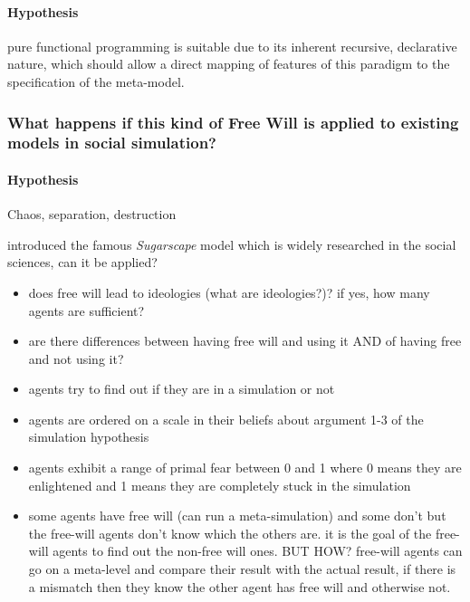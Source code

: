 \documentclass{article}
\begin{document}
\paragraph{Hypothesis} pure functional programming is suitable due to its inherent recursive, declarative nature, which should allow a direct mapping of features of this paradigm to the specification of the meta-model.

\subsubsection{What happens if this kind of Free Will is applied to existing models in social simulation?}
\paragraph{Hypothesis} Chaos, separation, destruction

\cite{epstein_growing_1996} introduced the famous \textit{Sugarscape} model which is widely researched in the social sciences, can it be applied?

\begin{itemize}
	\item does free will lead to ideologies (what are ideologies?)? if yes, how many agents are sufficient?
	\item are there differences between having free will and using it AND of having free and not using it?
	\item agents try to find out if they are in a simulation or not
	\item agents are ordered on a scale in their beliefs about argument 1-3 of the simulation hypothesis 
	\item agents exhibit a range of primal fear between 0 and 1 where 0 means they are enlightened and 1 means they are completely stuck in the simulation
	\item some agents have free will (can run a meta-simulation) and some don't but the free-will agents don't know which the others are. it is the goal of the free-will agents to find out the non-free will ones. BUT HOW? free-will agents can go on a meta-level and compare their result with the actual result, if there is a mismatch then they know the other agent has free will and otherwise not.
\end{itemize}



\end{document}
